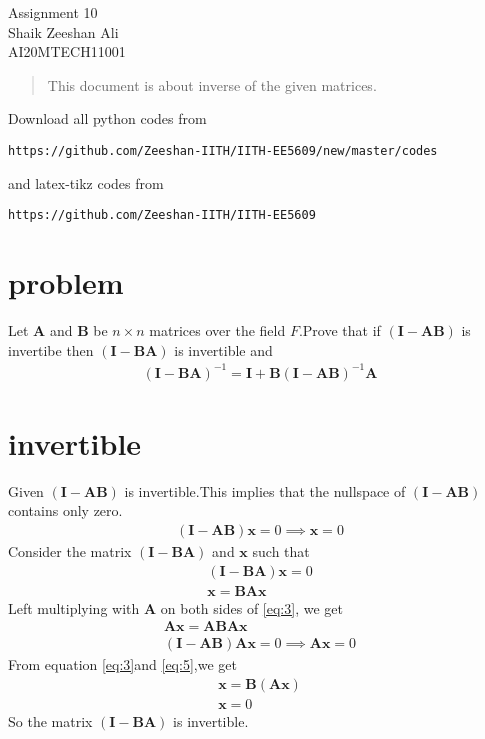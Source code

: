 \documentclass[journal,12pt,twocolumn]{IEEEtran}
\providecommand{\brak}[1]{\ensuremath{\left(#1\right)}}
\numberwithin{equation}{subsection}
\let\vec\mathbf
\begin{document}
\begin{center}
\huge Assignment 10\\

\large Shaik Zeeshan Ali\\
\large AI20MTECH11001\\
\end{center}
\begin{abstract}
This document is about inverse of the given matrices.
\end{abstract}
Download all python codes from 
\begin{lstlisting}
https://github.com/Zeeshan-IITH/IITH-EE5609/new/master/codes
\end{lstlisting}

and latex-tikz codes from 
\begin{lstlisting}
https://github.com/Zeeshan-IITH/IITH-EE5609
\end{lstlisting}
\section{problem}
Let $\vec{A}$ and $\vec{B}$ be $n\times n$ matrices over the field $F$.Prove that if $\brak{\vec{I}-\vec{A}\vec{B}}$ is invertibe then $\brak{\vec{I}-\vec{B}\vec{A}}$ is invertible and
\begin{align}
    \brak{\vec{I}-\vec{B}\vec{A}}^{-1}=\vec{I}+\vec{B}\brak{\vec{I}-\vec{A}\vec{B}}^{-1}\vec{A}
\end{align}
\section{invertible}
Given $\brak{\vec{I}-\vec{A}\vec{B}}$ is invertible.This implies that the nullspace of $\brak{\vec{I}-\vec{A}\vec{B}}$ contains only zero.
\begin{align}
    \brak{\vec{I}-\vec{A}\vec{B}}\vec{x}=0\implies\vec{x}=0
\end{align}
Consider the matrix $\brak{\vec{I}-\vec{B}\vec{A}}$ and $\vec{x}$ such that
\begin{align}
    \brak{\vec{I}-\vec{B}\vec{A}}\vec{x}=0\\
    \vec{x}=\vec{BA}\vec{x}\label{eq:3}
\end{align}
Left multiplying with $\vec{A}$ on both sides of \eqref{eq:3}, we get
\begin{align}
    \vec{A}\vec{x}=\vec{ABA}\vec{x}\\
    \brak{\vec{I}-\vec{A}\vec{B}}\vec{A}\vec{x}=0\implies\vec{A}\vec{x}=0\label{eq:5}
\end{align}
From equation \eqref{eq:3}and \eqref{eq:5},we get
\begin{align}
    \vec{x}=\vec{B}\brak{\vec{Ax}}\\
    \vec{x}=0
\end{align}
So the matrix $\brak{\vec{I}-\vec{B}\vec{A}}$ is invertible.
\end{document}
